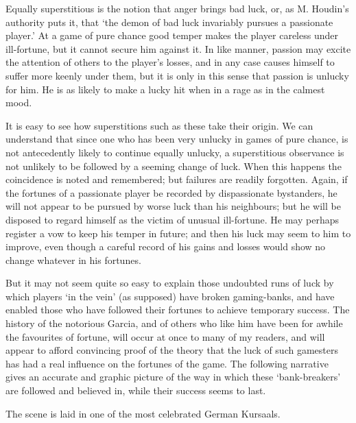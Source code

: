 \documentclass[letterpaper,12pt,oneside,openany]{memoir}
\begin{document}
Equally superstitious is the notion that anger brings
bad luck, or, as M. Houdin's authority puts it, that
`the demon of bad luck invariably pursues a passionate
player.' At a game of pure chance good temper makes
the player careless under ill-fortune, but it cannot
secure him against it. In like manner, passion may
excite the attention of others to the player's losses, and
in any case causes himself to suffer more keenly under
them, but it is only in this sense that passion is unlucky
for him. He is as likely to make a lucky hit
when in a rage as in the calmest mood.

It is easy to see how superstitions such as these take
their origin. We can understand that since one who
has been very unlucky in games of pure chance, is not
antecedently likely to continue equally unlucky, a
superstitious observance is not unlikely to be followed
by a seeming change of luck. When this happens the
coincidence is noted and remembered; but failures are
readily forgotten. Again, if the fortunes of a passionate
player be recorded by dispassionate bystanders, he will
not appear to be pursued by worse luck than his neighbours;
but he will be disposed to regard himself as the
victim of unusual ill-fortune. He may perhaps register
a vow to keep his temper in future; and then his luck
may seem to him to improve, even though a careful
record of his gains and losses would show no change
whatever in his fortunes.

But it may not seem quite so easy to explain those
undoubted runs of luck by which players `in the vein'
(as supposed) have broken gaming-banks, and have
enabled those who have followed their fortunes to
achieve temporary success. The history of the notorious
Garcia, and of others who like him have been for
awhile the favourites of fortune, will occur at once to
many of my readers, and will appear to afford convincing
proof of the theory that the luck of such gamesters
has had a real influence on the fortunes of the
game. The following narrative gives an accurate and
graphic picture of the way in which these `bank-breakers'
are followed and believed in, while their
success seems to last.

The scene is laid in one of the most celebrated
German Kursaals.
\end{document}

